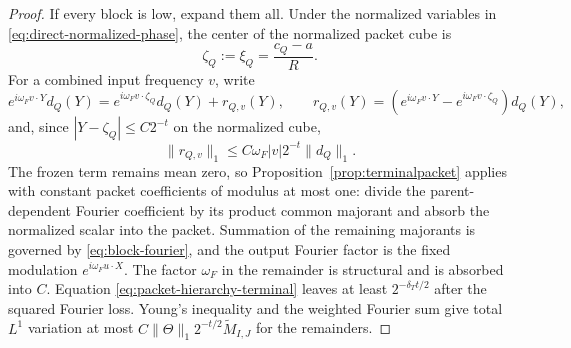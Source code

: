 \documentclass[11pt]{article}
\numberwithin{equation}{section}
\theoremstyle{remark}
\theoremstyle{definition}
\newcommand{\norm}[1]{\lVert #1\rVert}
\begin{document}
\begin{proof}
If every block is low, expand them all.  Under the normalized variables in
\eqref{eq:direct-normalized-phase}, the center of the normalized packet
cube is
\begin{equation}\label{eq:direct-normalized-packet-center}
 \zeta_Q:=\xi_Q=\frac{c_Q-a}{R}.
\end{equation}
For a combined input frequency $v$, write
\[
 e^{i\omega_F v\cdot Y}d_Q(Y)=e^{i\omega_F v\cdot\zeta_Q}d_Q(Y)+r_{Q,v}(Y),
 \qquad
 r_{Q,v}(Y)=(e^{i\omega_F v\cdot Y}-e^{i\omega_F v\cdot\zeta_Q})d_Q(Y),
\]
and, since $|Y-\zeta_Q|\le C2^{-t}$ on the normalized cube,
\[
 \norm{r_{Q,v}}_1\le C\omega_F|v|2^{-t}\norm{d_Q}_1.
\]
The frozen term remains mean zero, so
Proposition~\ref{prop:terminalpacket} applies with constant packet
coefficients of modulus at most one: divide the parent-dependent Fourier
coefficient by its product common majorant and absorb the normalized
scalar into the packet.  Summation of the remaining majorants is governed
by \eqref{eq:block-fourier}, and the output Fourier factor is the fixed
modulation $e^{i\omega_F u\cdot X}$.  The factor $\omega_F$ in the
remainder is structural and is absorbed into $C$.
Equation \eqref{eq:packet-hierarchy-terminal} leaves at least
$2^{-\delta_Tt/2}$ after the squared Fourier loss.  Young's inequality and
the weighted Fourier sum give total $L^1$ variation at most
$C\norm\Theta_1 2^{-t/2}\widetilde M_{I,J}$ for the remainders.


\end{proof}
\end{document}
